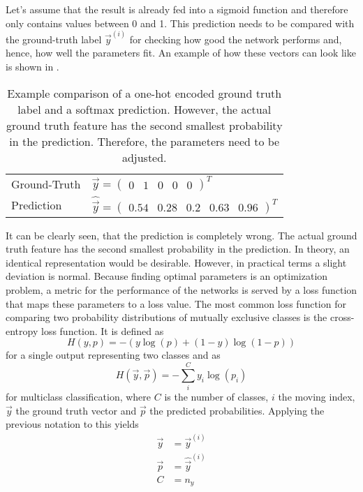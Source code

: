 Let's assume that the result is already fed into a sigmoid function and therefore only contains values between 0 and 1.
This prediction needs to be compared with the ground-truth label $\vec{y}^{(i)}$ for checking how good the network performs and, hence, how well the parameters fit.
An example of how these vectors can look like is shown in .
\begin{table}[]
	\centering
	\caption[Example Comparison of One-Hot Encoded Ground-Truth Label and Prediction]{Example comparison of a one-hot encoded ground truth label and a softmax prediction. However, the actual ground truth feature has the second smallest probability in the prediction. Therefore, the parameters need to be adjusted.}
	\label{tab:prediction}
	\begin{tabular}{ll}
		Ground-Truth & $\vec{y} = \begin{pmatrix} 0 & 1 & 0 & 0 & 0 \end{pmatrix}^T$                     \\
		Prediction   & $\hat{\vec{y}} = \begin{pmatrix} 0.54 & 0.28 & 0.2 & 0.63 & 0.96 \end{pmatrix}^T$
	\end{tabular}
\end{table}
It can be clearly seen, that the prediction is completely wrong.
The actual ground truth feature has the second smallest probability in the prediction.
In theory, an identical representation would be desirable.
However, in practical terms a slight deviation is normal.
Because finding optimal parameters is an optimization problem, a metric for the performance of the networks is served by a loss function that maps these parameters to a loss value.
The most common loss function for comparing two probability distributions of mutually exclusive classes is the cross-entropy loss function.
It is defined as
\begin{equation}
	H(y,p) = -(y \log(p) + (1-y) \log(1-p))
\end{equation}
for a single output representing two classes and as
\begin{equation}
	\label{eq:cross-entropy-loss}
	H(\vec{y}, \vec{p}) = - \sum_{i}^{C} y_i \log (p_i)
\end{equation}
for multiclass classification, where $C$ is the number of classes, $i$ the moving index, $\vec{y}$ the ground truth vector and $\vec{p}$ the predicted probabilities\cite{murphy2013machine}.
Applying the previous notation to this yields
\begin{subequations}
	\begin{align}
		\vec{y} &= \vec{y}^{(i)} \\
		\vec{p} &= \hat{\vec{y}}^{(i)} \\
		C &= n_y
	\end{align}
\end{subequations}
